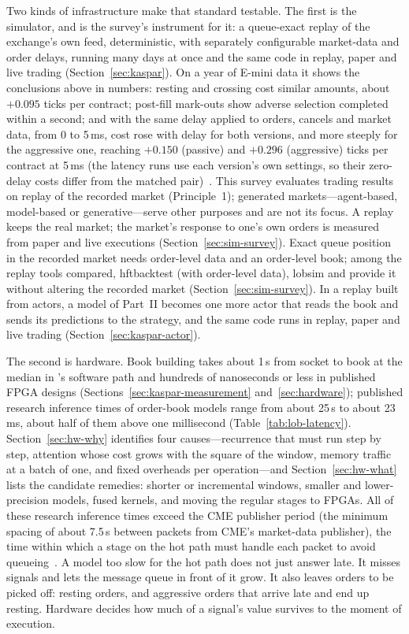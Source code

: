 Two kinds of infrastructure make that standard testable. The first is the simulator, and \kasparhft{} is the survey's
instrument for it: a queue-exact replay of the exchange's own feed, deterministic, with separately configurable
market-data and order delays, running many days at once and the same code in replay, paper and live trading
(Section~\ref{sec:kaspar}). On a year of E-mini data it shows the conclusions above in numbers: resting and crossing
cost similar amounts, about $+0.095$ ticks per contract; post-fill mark-outs show adverse selection completed within a
second; and with the same delay applied to orders, cancels and market data, from 0 to 5\,ms, cost rose with delay
for both versions, and more steeply for the aggressive one, reaching $+0.150$ (passive) and $+0.296$
(aggressive) ticks per contract at 5\,ms (the latency runs use each version's own settings, so their zero-delay costs
differ from the matched pair)~\citep{maciejewski_shadow}. This survey evaluates trading results on replay of
the recorded market (Principle~1); generated markets---agent-based, model-based or generative---serve other purposes
and are not its focus. A replay keeps the real market; the
market's response to one's own orders is measured from paper and live executions (Section~\ref{sec:sim-survey}).
Exact queue position in the recorded market
needs order-level data and an order-level book; among the replay tools compared, hftbacktest (with order-level
data), lobsim and \kasparhft{} provide it without altering the recorded market (Section~\ref{sec:sim-survey}). In a replay built from actors, a model of
Part~II becomes one more actor that reads the book and sends its predictions to the strategy, and the same code runs
in replay, paper and live trading (Section~\ref{sec:kaspar-actor}).

The second is hardware. Book building takes about 1\,\textmu s from socket to book at the median in \kasparhft{}'s software path and
hundreds of nanoseconds or less in published FPGA designs (Sections~\ref{sec:kaspar-measurement} and~\ref{sec:hardware}); published research inference times of order-book models range from
about 25\,\textmu s to about 23\,ms, about half of them above one millisecond (Table~\ref{tab:lob-latency}). Section~\ref{sec:hw-why}
identifies four causes---recurrence that must run step by step, attention whose cost grows with the square of the
window, memory traffic at a batch of one, and fixed overheads per operation---and Section~\ref{sec:hw-what} lists the
candidate remedies: shorter or incremental windows, smaller and lower-precision models, fused kernels, and moving the
regular stages to FPGAs. All of these research inference times exceed the CME publisher period (the minimum spacing of about
7.5\,\textmu s between packets from CME's market-data publisher), the time within which a stage on the hot path must
handle each packet to avoid queueing~\citep{maciejewski2026packets}. A model too slow for the hot path does not just
answer late. It misses signals and lets the message queue in front of it grow. It also leaves orders to be picked off:
resting orders, and aggressive orders that arrive late and end up resting. Hardware decides how much of a signal's
value survives to the moment of execution.

